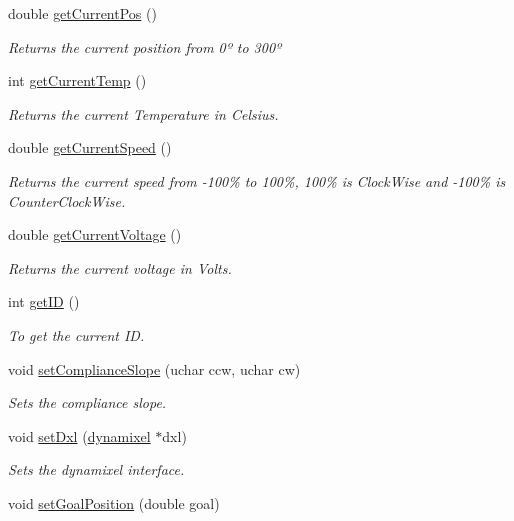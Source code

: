 \begin{DoxyCompactItemize}
double \hyperlink{a00001_af9722b9c1f82fbfd97fe5e0a44369e8a}{get\+Current\+Pos} ()
\begin{DoxyCompactList}\small\item\em Returns the current position from 0º to 300º \end{DoxyCompactList}\item 
int \hyperlink{a00001_ab16fad4c8c034d56acce15fc9102f34d}{get\+Current\+Temp} ()
\begin{DoxyCompactList}\small\item\em Returns the current Temperature in Celsius. \end{DoxyCompactList}\item 
double \hyperlink{a00001_a23c7ed54716c4b144a68d801f324e3ef}{get\+Current\+Speed} ()
\begin{DoxyCompactList}\small\item\em Returns the current speed from -\/100\% to 100\%, 100\% is Clock\+Wise and -\/100\% is Counter\+Clock\+Wise. \end{DoxyCompactList}\item 
double \hyperlink{a00001_a9ef946bfc1ad4dce5fed4101ed321efe}{get\+Current\+Voltage} ()
\begin{DoxyCompactList}\small\item\em Returns the current voltage in Volts. \end{DoxyCompactList}\item 
int \hyperlink{a00001_a745ab1f31fa2cd8c7a5797aeb605cd0b}{get\+I\+D} ()
\begin{DoxyCompactList}\small\item\em To get the current I\+D. \end{DoxyCompactList}\item 
void \hyperlink{a00001_a6ef2e11a3b0bdb5015142ba04593a770}{set\+Compliance\+Slope} (uchar ccw, uchar cw)
\begin{DoxyCompactList}\small\item\em Sets the compliance slope. \end{DoxyCompactList}\item 
void \hyperlink{a00001_a74a5a89387f0f51e053f05a6c2c0b9c5}{set\+Dxl} (\hyperlink{a00004}{dynamixel} $\ast$dxl)
\begin{DoxyCompactList}\small\item\em Sets the dynamixel interface. \end{DoxyCompactList}\item 
void \hyperlink{a00001_a6b27a3c6314604b499d9fa47d180f5d3}{set\+Goal\+Position} (double goal)

\end{DoxyCompactItemize}
